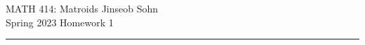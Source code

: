 \documentclass[12pt, letterpaper]{article}
\begin{document}
\raggedright
MATH 414: Matroids \hfill Jinseob Sohn \\
Spring 2023 \hfill Homework 1
\rule[8pt]{\textwidth}{0.6pt}
\end{document}
